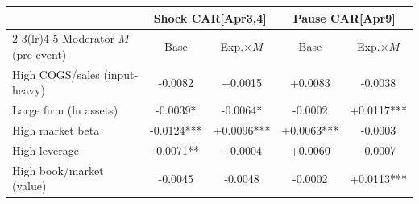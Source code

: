 \begin{tabular}{lcccc}
\toprule
& \multicolumn{2}{c}{Shock CAR[Apr3,4]} & \multicolumn{2}{c}{Pause CAR[Apr9]} \\
\cmidrule(lr){2-3}\cmidrule(lr){4-5}
Moderator $M$ (pre-event) & Base & Exp.$\times M$ & Base & Exp.$\times M$ \\
\midrule
High COGS/sales (input-heavy) & -0.0082 & +0.0015 & +0.0083 & -0.0038 \\
Large firm (ln assets) & -0.0039* & -0.0064* & -0.0002 & +0.0117*** \\
High market beta & -0.0124*** & +0.0096*** & +0.0063*** & -0.0003 \\
High leverage & -0.0071** & +0.0004 & +0.0060 & -0.0007 \\
High book/market (value) & -0.0045 & -0.0048 & -0.0002 & +0.0113*** \\
\bottomrule
\end{tabular}
